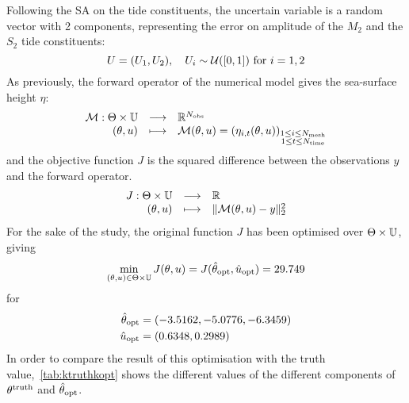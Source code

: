 \documentclass[../../Main_ManuscritThese.tex]{subfiles}
\begin{document}
Following the SA on the tide constituents, the uncertain variable is a
random vector with \num{2} components, representing the error on
amplitude of the $M_2$ and the $S_2$ tide constituents:
\begin{equation}
  \UU = (\UU_1,\UU_2), \quad \UU_i \sim \mathcal{U}(\interval{0}{1}) \text{ for } i=1,2
\end{equation}
As previously, the forward operator of the numerical model gives the sea-surface height $\eta$:
\begin{equation}
  \begin{array}{rcl}
    \mathcal{M}: \Kspace \times \Uspace &\longrightarrow& \mathbb{R}^{N_{\mathrm{obs}}} \\
    (\kk, \uu)& \longmapsto & \mathcal{M}(\kk, \uu) = \left(\eta_{i,t}(\kk, \uu)\right)_{\substack{1 \leq i \leq N_{\mathrm{mesh}} \\ 1 \leq t \leq N_{\mathrm{time}}}} \\ 
  \end{array}
\end{equation}
and the objective function $J$ is the squared difference between the
observations $y$ and the forward operator.
\begin{equation}
  \begin{array}{rcl}
    J: \Kspace \times \Uspace & \longrightarrow & \mathbb{R} \\
    (\kk, \uu) & \longmapsto & \|\mathcal{M}(\kk, \uu) - y \|^2_2
  \end{array}
\end{equation}
For the sake of the study, the original function $J$ has been
optimised over $\Kspace\times\Uspace$, giving
\begin{equation}
  \min_{(\kk,\uu) \in \Kspace \times \Uspace} J(\kk, \uu) = J(\hat{\kk}_{\mathrm{opt}}, \hat{\uu}_{\mathrm{opt}})= \num{29.749}
\end{equation}
for
\begin{align}
  \hat{\kk}_{\mathrm{opt}}                     & = (\num[round-mode=places,round-precision=4]{-3.5161661} , \num[round-mode=places,round-precision=4]{-5.07764701}, \num[round-mode=places,round-precision=4]{-6.34588442})                                                                                                            \\\hat{\uu}_{\mathrm{opt}} & = (\num[round-mode=places,round-precision=4]{0.6347829},\num[round-mode=places,round-precision=4]{0.29890637})
\end{align}
In order to compare the result of this optimisation with the truth
value,~\cref{tab:ktruthkopt} shows the different values of the
different components of $\kk^{\mathrm{truth}}$ and
$\hat{\kk}_{\mathrm{opt}}$.
\end{document}
